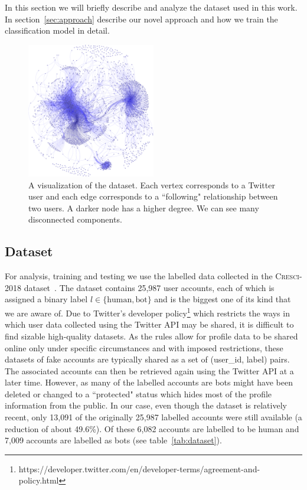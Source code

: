 In this section we will briefly describe and analyze the dataset used in this work. In section~\ref{sec:approach} describe our novel approach and how we train the classification model in detail.

\begin{figure}[t!]
    \centering
    \includegraphics[width=0.5\textwidth]{FIG/graph-crop.pdf}
    \caption{A visualization of the dataset. Each vertex corresponds to a Twitter user and each edge corresponds to a ``following" relationship between two users. A darker node has a higher degree. We can see many disconnected components.}
    \label{fig:twitter}
\end{figure}

\subsection{Dataset}
For analysis, training and testing we use the labelled data collected in the \textsc{Cresci-2018} dataset~\cite{cresci2018fake}. The dataset contains 25,987 user accounts, each of which is assigned a binary label $l \in \{\text{human},\text{bot}\}$ and is the biggest one of its kind that we are aware of. Due to Twitter's developer policy\footnote{https://developer.twitter.com/en/developer-terms/agreement-and-policy.html} which restricts the ways in which user data collected using the Twitter API may be shared, it is difficult to find sizable high-quality datasets. As the rules allow for profile data to be shared online only under specific circumstances and with imposed restrictions, these datasets of fake accounts are typically shared as a set of (user\_id, label) pairs. The associated accounts can then be retrieved again using the Twitter API at a later time. However, as many of the labelled accounts are bots might have been deleted or changed to a ``protected" status which hides most of the profile information from the public. In our case, even though the dataset is relatively recent, only 13,091 of the originally 25,987 labelled accounts were still available (a reduction of about 49.6\%). Of these 6,082 accounts are labelled to be human and 7,009 accounts are labelled as bots (see table~\ref{tab:dataset}).


